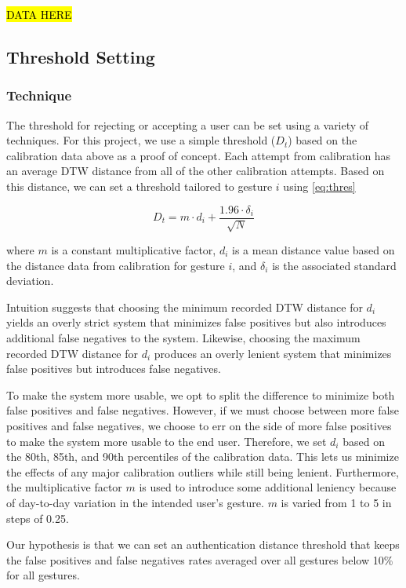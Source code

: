 \hl{DATA HERE}

\subsection{Threshold Setting}

\subsubsection{Technique}

The threshold for rejecting or accepting a user can be set using a variety of techniques. For this project, we use a simple threshold ($D_{t}$) based on the calibration data above as a proof of concept. Each attempt from calibration has an average \gls{DTW} distance from all of the other calibration attempts. Based on this distance, we can set a threshold tailored to gesture $i$ using \autoref{eq:thres}

\begin{equation}
D_{t} = m \cdot d_{i} + \frac{1.96 \cdot \delta_{i}}  {\sqrt{N}}
\label{eq:thres}
\end{equation}

\noindent where $m$ is a constant multiplicative factor, $d_{i}$ is a mean distance value based on the distance data from calibration for gesture $i$, and $\delta_{i}$ is the associated standard deviation.

Intuition suggests that choosing the minimum recorded \gls{DTW} distance for $d_{i}$ yields an overly strict system that minimizes false positives but also introduces additional false negatives to the system. Likewise, choosing the maximum recorded \gls{DTW} distance for $d_{i}$ produces an overly lenient system that minimizes false positives but introduces false negatives. 

To make the system more usable, we opt to split the difference to minimize both false positives and false negatives. However, if we must choose between more false positives and false negatives, we choose to err on the side of more false positives to make the system more usable to the end user. Therefore, we set $d_{i}$ based on the 80th, 85th, and 90th percentiles of the calibration data. This lets us minimize the effects of any major calibration outliers while still being lenient. Furthermore, the multiplicative factor $m$ is used to introduce some additional leniency because of day-to-day variation in the intended user's gesture. $m$ is varied from 1 to 5 in steps of 0.25.

Our hypothesis is that we can set an authentication distance threshold that keeps the false positives and false negatives rates averaged over all gestures below 10\% for all gestures.


